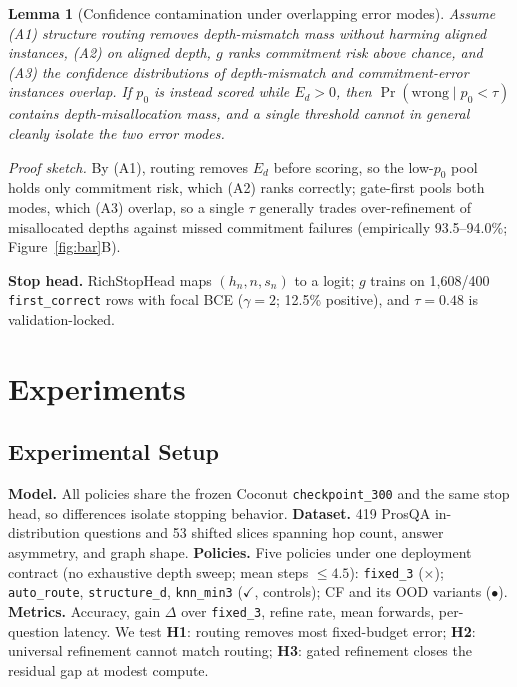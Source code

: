 \documentclass{article}
\theoremstyle{compactthm}
\newtheorem{lemma}{Lemma}
\theoremstyle{compactdef}
\begin{document}
\begin{lemma}[Confidence contamination under overlapping error modes]
\label{lem:contam}
Assume \emph{(A1)} structure routing removes depth-mismatch mass without harming aligned instances, \emph{(A2)} on aligned depth, $g$ ranks commitment risk above chance, and \emph{(A3)} the confidence distributions of depth-mismatch and commitment-error instances overlap. If $p_0$ is instead scored while $E_d>0$, then $\Pr(\mathrm{wrong}\mid p_0<\tau)$ contains depth-misallocation mass, and a single threshold cannot in general cleanly isolate the two error modes.
\end{lemma}
\textit{Proof sketch.} By (A1), routing removes $E_d$ before scoring, so the low-$p_0$ pool holds only commitment risk, which (A2) ranks correctly; gate-first pools both modes, which (A3) overlap, so a single $\tau$ generally trades over-refinement of misallocated depths against missed commitment failures (empirically 93.5--94.0\%; Figure~\ref{fig:bar}B).

\noindent\textbf{Stop head.} RichStopHead maps $(h_n,n,s_n)$ to a logit; $g$ trains on 1{,}608/400 \texttt{first\_correct} rows with focal BCE \citep{lin2017focal} ($\gamma=2$; 12.5\% positive), and $\tau=0.48$ is validation-locked.



\section{Experiments}
\label{sec:exp}
\subsection{Experimental Setup}
\noindent\textbf{Model.} All policies share the frozen Coconut \texttt{checkpoint\_300} \citep{hao2024coconut} and the same stop head, so differences isolate stopping behavior. \textbf{Dataset.} 419 ProsQA in-distribution questions and 53 shifted slices spanning hop count, answer asymmetry, and graph shape. \textbf{Policies.} Five policies under one deployment contract (no exhaustive depth sweep; mean steps $\le 4.5$): \texttt{fixed\_3} ($\times$); \texttt{auto\_route}, \texttt{structure\_d}, \texttt{knn\_min3} ($\checkmark$, controls); CF and its OOD variants ($\bullet$). \textbf{Metrics.} Accuracy, gain $\Delta$ over \texttt{fixed\_3}, refine rate, mean forwards, per-question latency. We test \textbf{H1}: routing removes most fixed-budget error; \textbf{H2}: universal refinement cannot match routing; \textbf{H3}: gated refinement closes the residual gap at modest compute.
\end{document}
